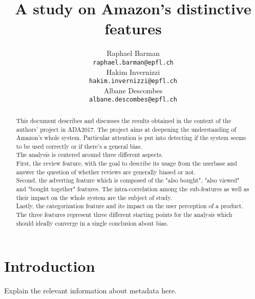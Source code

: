 \documentclass[11pt]{article}
\title{A study on Amazon's distinctive features}
\author{Raphael Barman \\
  {\tt raphael.barman@epfl.ch} \\\And
  Hakim Invernizzi \\
  {\tt hakim.invernizzi@epfl.ch} \\\And
Albane Descombes \\
{\tt albane.descombes@epfl.ch} \\}
\date{}
\begin{document}
\maketitle
\begin{abstract}
  This document describes and discusses the results obtained in the context of the authors' project in ADA2017. The project aims at deepening the understanding 
  of Amazon's whole system. Particular attention is put into detecting if the system seems to be used correctly or if there's a general bias. \\
  The analysis is centered around three different aspects. \\ First, the review feature, with the goal to describe its usage from the userbase and answer the question of whether reviews are generally biased or not. \\ Second, the adverting feature which is composed of the "also bought", "also viewed" and "bought together" features. The intra-correlation among the sub-features as well as their impact on the whole system are the subject of study. \\ Lastly, the categorization feature and its impact on the user perception of a product. \\  The three features represent three different starting points for the analysis which should ideally converge in a single conclusion about bias.
\end{abstract}


\section{Introduction}
  Explain the relevant information about metadata here.
  
\end{document}
